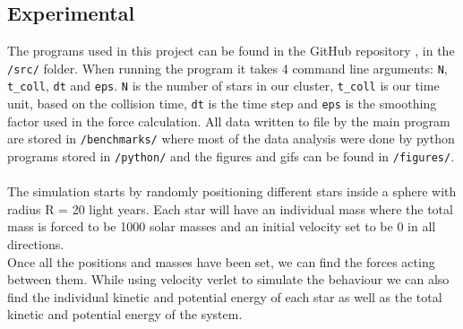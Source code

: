 \documentclass{article}
\begin{document}
\subsection{Experimental}
The programs used in this project can be found in the GitHub repository \cite{GitHub}, in the \texttt{/src/} folder. When running the program it takes 4 command line arguments: \texttt{N}, \texttt{t\_coll}, \texttt{dt} and \texttt{eps}. \texttt{N} is the number of stars in our cluster, \texttt{t\_coll} is our time unit, based on the collision time, \texttt{dt} is the time step and \texttt{eps} is the smoothing factor used in the force calculation. All data written to file by the main program are stored in \texttt{/benchmarks/} where most of the data analysis were done by python programs stored in \texttt{/python/} and the figures and gifs can be found in \texttt{/figures/}. \\ \\
The simulation starts by randomly positioning different stars inside a sphere with radius R = 20 light years. Each star will have an individual mass where the total mass is forced to be 1000 solar masses and an initial velocity set to be 0 in all directions. \\
Once all the positions and masses have been set, we can find the forces acting between them. While using velocity verlet to simulate the behaviour we can also find the individual kinetic and potential energy of each star as well as the total kinetic and potential energy of the system. 
\end{document}
